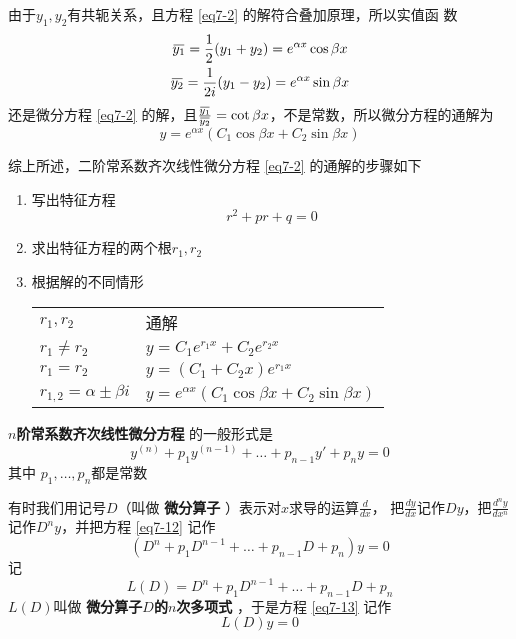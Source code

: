 \documentclass[11pt]{article}
\begin{document}
\begin{enumerate}
由于\(y_1,y_2\)有共轭关系，且方程 \eqref{eq7-2} 的解符合叠加原理，所以实值函
数
\begin{gather*}
\bbar{y_1}=\frac{1}{2}(y_1+y_2)=e^{\alpha x}\cos\beta x\\
\bbar{y_2}=\frac{1}{2i}(y_1-y_2)=e^{\alpha x}\sin\beta x
\end{gather*}
还是微分方程 \eqref{eq7-2} 的解，且\(\frac{\bbar{y_1}}{\bbar{y_2}}=\cot
      \beta x\)，不是常数，所以微分方程的通解为
\begin{equation*}
y=e^{\alpha x}(C_1\cos\beta x+C_2\sin\beta x)
\end{equation*}
\end{enumerate}


综上所述，二阶常系数齐次线性微分方程 \eqref{eq7-2} 的通解的步骤如下
\begin{enumerate}
\item 写出特征方程
\begin{equation*}
r^2+pr+q=0
\end{equation*}
\item 求出特征方程的两个根\(r_1,r_2\)
\item 根据解的不同情形
\begin{center}
\begin{tabular}{ll}
\(r_1,r_2\) & 通解\\
\(r_1\neq r_2\) & \(y=C_1e^{r_1x}+C_2e^{r_2x}\)\\
\(r_1=r_2\) & \(y=(C_1+C_2x)e^{r_1x}\)\\
\(r_{1,2}=\alpha\pm\beta i\) & \(y=e^{\alpha x}(C_1\cos\beta x+C_2\sin\beta x)\)\\
\end{tabular}
\end{center}
\end{enumerate}


\textbf{\(n\)阶常系数齐次线性微分方程} 的一般形式是
\begin{equation}
y^{(n)}+p_1y^{(n-1)}+\dots+p_{n-1}y'+p_ny=0
\label{eq7-12}
\end{equation}
其中 \(p_1,\dots,p_n\)都是常数

有时我们用记号\(D\)（叫做 \textbf{微分算子} ）表示对\(x\)求导的运算\(\frac{d}{dx}\)，
把\(\frac{dy}{dx}\)记作\(Dy\)，把\(\frac{d^ny}{dx^n}\)记作\(D^ny\)，并把方程
\eqref{eq7-12} 记作
\begin{equation}
(D^n+p_1D^{n-1}+\dots+p_{n-1}D+p_n)y=0
\label{eq7-13}
\end{equation}
记
\begin{equation*}
L(D)=D^n+p_1D^{n-1}+\dots+p_{n-1}D+p_n
\end{equation*}
\(L(D)\)叫做 \textbf{微分算子\(D\)的\(n\)次多项式} ，于是方程 \eqref{eq7-13} 记作
\begin{equation*}
L(D)y=0
\end{equation*}
\end{document}
